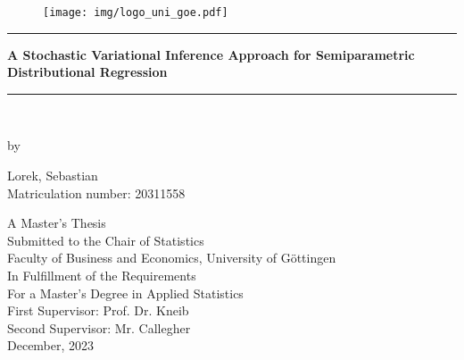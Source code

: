 \thispagestyle{empty}

\vspace*{\fill}

\begin{figure}[htbp]
  \centering
  \texttt{[image: img/logo\_uni\_goe.pdf]}
\end{figure}

\bigskip

\begin{center}

\rule{\linewidth}{0.5mm}

{\Large \textbf{A Stochastic Variational Inference Approach for Semiparametric
                Distributional Regression}}

\rule{\linewidth}{0.5mm} \\

\end{center}

\bigskip

\begin{center}

by \\

\bigskip

Lorek, Sebastian \\
Matriculation number: 20311558

\end{center}

\bigskip

\begin{center}

A Master's Thesis \\
Submitted to the Chair of Statistics \\
Faculty of Business and Economics, University of Göttingen \\
In Fulfillment of the Requirements \\
For a Master's Degree in Applied Statistics\\
First Supervisor: Prof. Dr. Kneib \\
Second Supervisor: Mr. Callegher \\
December, 2023 \\

\end{center}


\vspace*{\fill}

